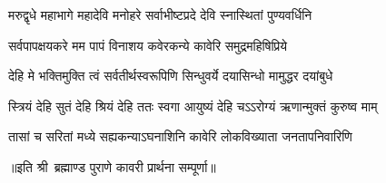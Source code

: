 

\twolineshlioka
{मरुद्वृधे महाभागे महादेवि मनोहरे}
{सर्वाभीष्टप्रदे देवि स्नास्थितां पुण्यवर्धिनि}%

\twolineshlioka
{सर्वपापक्षयकरे मम पापं विनाशय}
{कवेरकन्ये कावेरि समुद्रमहिषिप्रिये}%

\twolineshlioka
{देहि मे भक्तिमुक्ति त्वं सर्वतीर्थस्वरूपिणि}
{सिन्धुवर्ये दयासिन्धो मामुद्धर दयांबुधे}%

\twolineshlioka
{स्त्रियं देहि सुतं देहि श्रियं देहि ततः स्वगा}
{आयुष्यं देहि चऽऽरोग्यं ऋणान्मुक्तं कुरुष्व माम्}%

\twolineshlioka
{तासां च सरितां मध्ये सह्यकन्याऽघनाशिनि}
{कावेरि लोकविख्याता जनतापनिवारिणि}%

॥इति श्री~ब्रह्माण्ड पुराणे कावरी प्रार्थना सम्पूर्णा॥